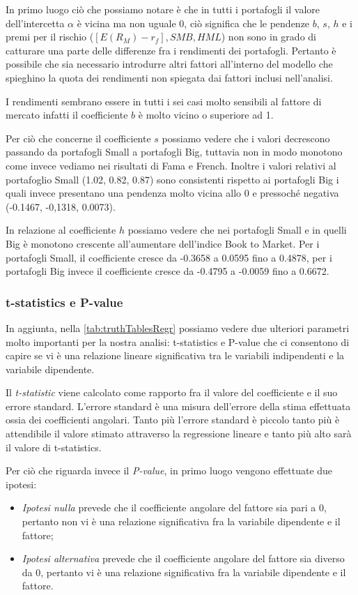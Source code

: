 In primo luogo ciò che possiamo notare è che in tutti i portafogli il valore dell'intercetta $\alpha$ è vicina ma non uguale 0, ciò significa che le pendenze $b$, $s$, $h$ e i premi per il rischio ($[E(R_M)-r_f], SMB, HML$) non sono in grado di catturare una parte delle differenze fra i rendimenti dei portafogli. Pertanto è possibile che sia necessario introdurre altri fattori all'interno del modello che spieghino la quota dei rendimenti non spiegata dai fattori inclusi nell'analisi.  

I rendimenti sembrano essere in tutti i sei casi molto sensibili al fattore di mercato infatti il coefficiente $b$ è molto vicino o superiore ad 1.


Per ciò che concerne il coefficiente $s$ possiamo vedere che i valori decrescono passando da portafogli Small a portafogli Big, tuttavia non in modo monotono come invece vediamo nei risultati di Fama e French. Inoltre i valori relativi al portafoglio Small (1.02, 0.82, 0.87) sono consistenti rispetto ai portafogli Big  i quali invece presentano una pendenza molto vicina allo 0 e pressoché negativa (-0.1467, -0,1318, 0.0073). 
 
In relazione al coefficiente $h$ possiamo vedere che nei portafogli Small e in quelli Big è monotono crescente all'aumentare dell'indice Book to Market. Per i portafogli Small, il coefficiente cresce da -0.3658 a 0.0595 fino a 0.4878, per i portafogli Big invece il coefficiente cresce da -0.4795 a -0.0059 fino a 0.6672. 

\subsubsection{t-statistics e P-value} In aggiunta, nella \ref{tab:truthTablesRegr} possiamo vedere due ulteriori parametri molto importanti per la nostra analisi: t-statistics e P-value che ci consentono di capire se vi è una relazione lineare significativa tra le variabili indipendenti e la variabile dipendente. 

Il \textit{t-statistic} viene calcolato come rapporto fra il valore del coefficiente e il suo errore standard. L'errore standard è una misura dell'errore della stima effettuata ossia dei coefficienti angolari. Tanto più l'errore standard è piccolo tanto più è attendibile il valore stimato attraverso la regressione lineare e tanto più alto sarà il valore di t-statistics. 

Per ciò che riguarda invece il \textit{P-value}, in primo luogo vengono effettuate due ipotesi: 
\begin{itemize}
	\item \textit{Ipotesi nulla} prevede che il coefficiente angolare del fattore sia pari a 0, pertanto non vi è una relazione significativa fra la variabile dipendente e il fattore;
	\item \textit{Ipotesi alternativa} prevede che il coefficiente angolare del fattore sia diverso da 0, pertanto vi è una relazione significativa fra la variabile dipendente e il fattore. 
\end{itemize}

